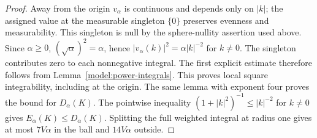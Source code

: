 \documentclass[11pt,a4paper]{article}
\theoremstyle{definition}
\theoremstyle{remark}
\begin{document}
\begin{proof}
Away from the origin $v_\alpha$ is continuous and depends only on
$|k|$; the assigned value at the measurable singleton $\{0\}$
preserves evenness and measurability. This singleton is null by the
sphere-nullity assertion used above. Since $\alpha\geq0$,
$(\sqrt\alpha)^2=\alpha$, hence
$|v_\alpha(k)|^2=\alpha|k|^{-2}$ for $k\ne0$.
The singleton contributes zero to each nonnegative integral. The
first explicit estimate therefore follows from
Lemma~\ref{model:power-integrals}. This proves local square
integrability, including at the origin. The same lemma with exponent
four proves the bound for $D_\alpha(K)$. The pointwise inequality
$(1+|k|^2)^{-1}\leq|k|^{-2}$ for $k\ne0$ gives
$E_\alpha(K)\leq D_\alpha(K)$. Splitting the full weighted integral
at radius one gives at most $7V\alpha$ in the ball and
$14V\alpha$ outside.


\end{proof}
\end{document}
